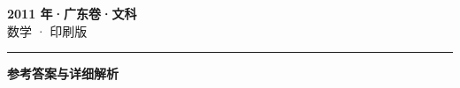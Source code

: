 \documentclass[zihao=5, a4paper]{ctexart}
\begin{document}
\begin{center}
  {\Large\bfseries 2011 年·广东卷·文科}\\[4pt]
  {\large 数学 · 印刷版}
\end{center}
\medskip
{}

\par\bigskip\hrule\bigskip
{}
\begin{center}{\large\bfseries 参考答案与详细解析}\end{center}
\smallskip

\end{document}
